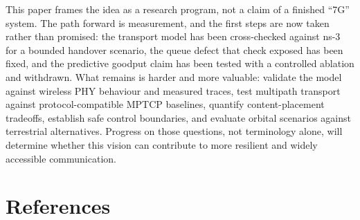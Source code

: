 \documentclass[
  american,
  11pt,
]{article}
\begin{document}
This paper frames the idea as a research program, not a claim of a
finished ``7G'' system. The path forward is measurement, and the first
steps are now taken rather than promised: the transport model has been
cross-checked against ns-3 for a bounded handover scenario, the queue
defect that check exposed has been fixed, and the predictive goodput
claim has been tested with a controlled ablation and withdrawn. What
remains is harder and more valuable: validate the model against wireless
PHY behaviour and measured traces, test multipath transport against
protocol-compatible MPTCP baselines, quantify content-placement
tradeoffs, establish safe control boundaries, and evaluate orbital
scenarios against terrestrial alternatives. Progress on those questions,
not terminology alone, will determine whether this vision can contribute
to more resilient and widely accessible communication.

\section{References}\label{references}
\end{document}
